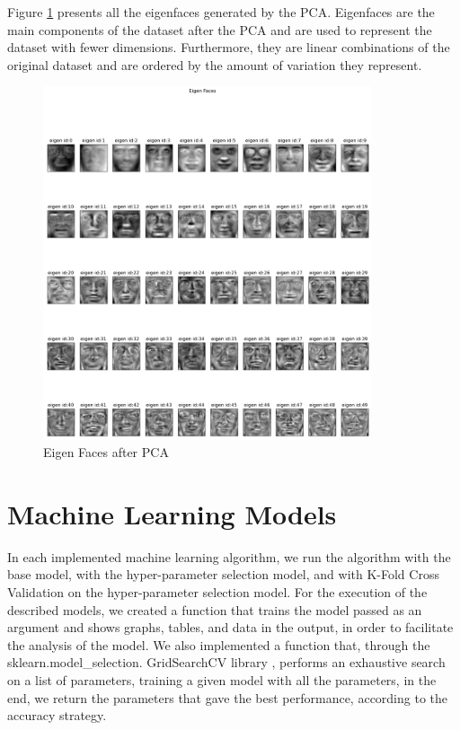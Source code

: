 \documentclass[conference]{IEEEtran}
\begin{document}
Figure \ref{img:eigen_faces.png} presents all the eigenfaces generated by the PCA. Eigenfaces are the main components of the dataset after the PCA and are used to represent the dataset with fewer dimensions. Furthermore, they are linear combinations of the original dataset and are ordered by the amount of variation they represent.

\begin{figure}[H]
    \centering
    \includegraphics[width=3.8in]{cnn/output.png}
    \caption{Eigen Faces after PCA}
    \label{img:eigen_faces.png}
\end{figure}

\section{Machine Learning Models}

In each implemented machine learning algorithm, we run the algorithm with the base model, with the hyper-parameter selection model, and with K-Fold Cross Validation on the hyper-parameter selection model. For the execution of the described models, we created a function that trains the model passed as an argument and shows graphs, tables, and data in the output, in order to facilitate the analysis of the model.
We also implemented a function that, through the sklearn.model\_selection. GridSearchCV library \cite{grid-search-cV}, performs an exhaustive search on a list of parameters, training a given model with all the parameters, in the end, we return the parameters that gave the best performance, according to the accuracy strategy.
\end{document}
